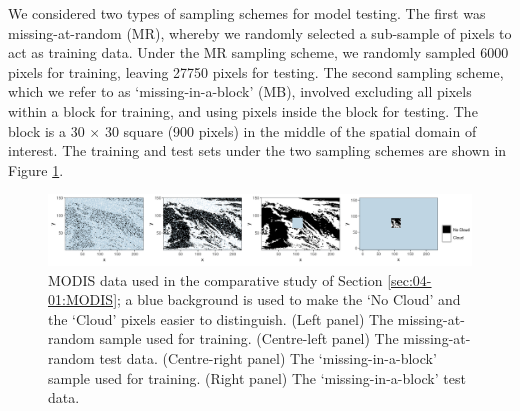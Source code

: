 \documentclass[article]{jss}
\begin{document}
We considered two types of sampling schemes for model testing.
 The first was missing-at-random (MR), whereby we randomly selected a sub-sample of pixels to act as training data.
 Under the MR sampling scheme, we randomly sampled 6000 pixels for training, leaving 27750 pixels for testing. 
 The second sampling scheme, which we refer to as `missing-in-a-block' (MB), involved excluding all pixels within a block for training, and using pixels inside the block for testing. 
 The block is a 30 $\times$ 30 square (900 pixels) in the middle of the spatial domain of interest. 
The training and test sets under the two sampling schemes are shown in Figure \ref{fig:03-04-Modis1}.
\begin{figure}[t!]
    \centering
    \includegraphics[width = \linewidth]{img/MODIS_data.png}
     \caption{
     MODIS data used in the comparative study of Section \ref{sec:04-01:MODIS}; a blue background is used to make the `No Cloud' and the `Cloud' pixels easier to distinguish. (Left panel) The missing-at-random sample used for training.  (Centre-left panel) The missing-at-random test data. (Centre-right panel) The `missing-in-a-block' sample used for training. (Right panel) The `missing-in-a-block' test data. 
     }\label{fig:03-04-Modis1}
\end{figure}
\end{document}
